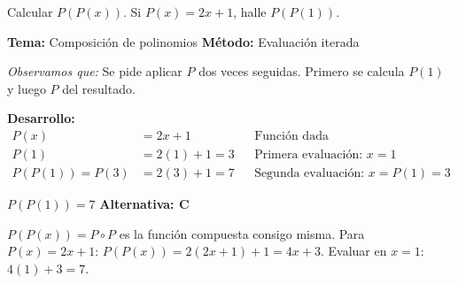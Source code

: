 \vspace{0.4cm}

\begin{tcolorbox}[
  enhanced, breakable,
  colback=GrisClaro, colframe=AzulPizarra,
  fonttitle=\bfseries\sffamily\color{white},
  title={Álgebra — Ejercicio 2},
  arc=3pt, boxrule=0.8pt
]

\begin{problema}
  Calcular $P(P(x))$. Si $P(x) = 2x + 1$, halle $P(P(1))$.
\end{problema}

\smallskip
\noindent
\textbf{\sffamily\color{AzulMedio}Tema:} Composición de polinomios \hfill
\textbf{\sffamily\color{AzulMedio}Método:} Evaluación iterada

\medskip
\noindent\textit{Observamos que:} Se pide aplicar $P$ dos veces seguidas. Primero se calcula
$P(1)$ y luego $P$ del resultado.

\noindent\textbf{\sffamily Desarrollo:}
\begin{align*}
  P(x) &= 2x + 1
    && \text{Función dada} \\[4pt]
  P(1) &= 2(1) + 1 = 3
    && \text{Primera evaluación: } x = 1 \\[4pt]
  P(P(1)) = P(3) &= 2(3) + 1 = 7
    && \text{Segunda evaluación: } x = P(1) = 3
\end{align*}

\begin{tcolorbox}[
  colback=AzulClaro!60, colframe=AzulPizarra,
  arc=2pt, boxrule=0.8pt, left=8pt, right=8pt
]
\centering
$\displaystyle P(P(1)) = 7$ \quad\textbf{Alternativa: C}
\end{tcolorbox}

\begin{cajatip}
$P(P(x)) = P \circ P$ es la función compuesta consigo misma. Para $P(x) = 2x+1$:
$P(P(x)) = 2(2x+1)+1 = 4x+3$. Evaluar en $x=1$: $4(1)+3=7$. \checkmark
\end{cajatip}

\end{tcolorbox}

\vspace{0.4cm}

